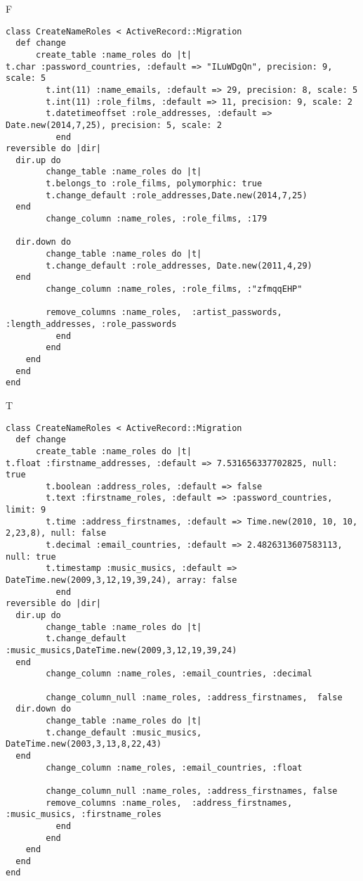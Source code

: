 F
\begin{verbatim}
class CreateNameRoles < ActiveRecord::Migration
  def change
	  create_table :name_roles do |t|
t.char :password_countries, :default => "ILuWDgQn", precision: 9, scale: 5
		t.int(11) :name_emails, :default => 29, precision: 8, scale: 5
		t.int(11) :role_films, :default => 11, precision: 9, scale: 2
		t.datetimeoffset :role_addresses, :default => Date.new(2014,7,25), precision: 5, scale: 2
		  end
reversible do |dir|
  dir.up do
		change_table :name_roles do |t|
		t.belongs_to :role_films, polymorphic: true
 		t.change_default :role_addresses,Date.new(2014,7,25)
  end
 		change_column :name_roles, :role_films, :179
   
  dir.down do
		change_table :name_roles do |t|
		t.change_default :role_addresses, Date.new(2011,4,29)
  end
 		change_column :name_roles, :role_films, :"zfmqqEHP"
   
		remove_columns :name_roles,  :artist_passwords, :length_addresses, :role_passwords 
	      end
	    end
    end 
  end
end

\end{verbatim}

T
\begin{verbatim}
class CreateNameRoles < ActiveRecord::Migration
  def change
	  create_table :name_roles do |t|
t.float :firstname_addresses, :default => 7.531656337702825, null: true
		t.boolean :address_roles, :default => false
		t.text :firstname_roles, :default => :password_countries, limit: 9
		t.time :address_firstnames, :default => Time.new(2010, 10, 10, 2,23,8), null: false
		t.decimal :email_countries, :default => 2.4826313607583113, null: true
		t.timestamp :music_musics, :default => DateTime.new(2009,3,12,19,39,24), array: false
		  end
reversible do |dir|
  dir.up do
		change_table :name_roles do |t|
		t.change_default :music_musics,DateTime.new(2009,3,12,19,39,24)
  end
 		change_column :name_roles, :email_countries, :decimal
   
		change_column_null :name_roles, :address_firstnames,  false
  dir.down do
		change_table :name_roles do |t|
		t.change_default :music_musics, DateTime.new(2003,3,13,8,22,43)
  end
 		change_column :name_roles, :email_countries, :float
   
		change_column_null :name_roles, :address_firstnames, false
 		remove_columns :name_roles,  :address_firstnames, :music_musics, :firstname_roles 
	      end
	    end
    end 
  end
end

\end{verbatim}

